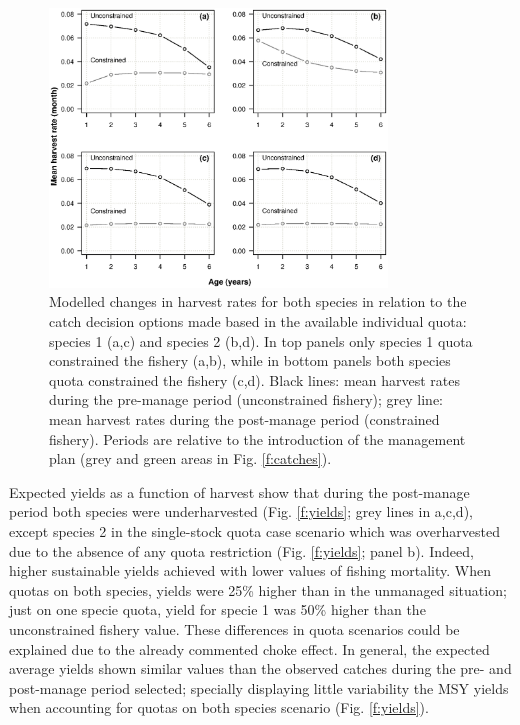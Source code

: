 \documentclass[12pt,oneline,a4paper,numbib]{ouparticle}
\numberwithin{equation}{subsection} %
\begin{document}
\begin{figure}[!ht]
\centering
\includegraphics[width=0.8\textwidth]{Figures/Selectivity.eps} 
\caption{Modelled changes in harvest rates for both species in relation to the catch decision options made based in the available individual quota: species 1 (a,c) and species 2 (b,d). In top panels only species 1 quota constrained the fishery (a,b), while in bottom panels both species quota constrained the fishery (c,d). Black lines: mean harvest rates during the pre-manage period (unconstrained fishery); grey line: mean harvest rates during the post-manage period (constrained fishery). Periods are relative to the introduction of the management plan (grey and green areas in Fig. \ref{f:catches}).}
\label{f:selectivity}
\end{figure}
 
Expected yields as a function of harvest show that during the post-manage period both species were underharvested (Fig. \ref{f:yields}; grey lines in a,c,d), except species 2 in the single-stock quota case scenario which was overharvested due to the absence of any quota restriction (Fig. \ref{f:yields}; panel b). Indeed, higher sustainable yields achieved with lower values of fishing mortality. When quotas on both species, yields were 25\% higher than in the unmanaged situation; just on one specie quota, yield for specie 1 was 50\% higher than the unconstrained fishery value. These differences in quota scenarios could be explained due to the already commented choke effect. In general, the expected average yields shown similar values than the observed catches during the pre- and post-manage period selected; specially displaying little variability the MSY yields when accounting for quotas on both species scenario (Fig. \ref{f:yields}).
\end{document}
